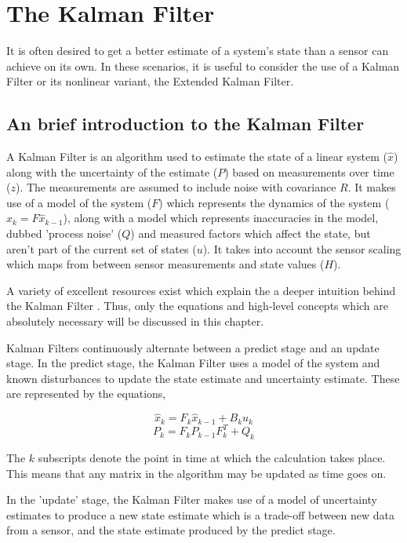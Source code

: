 \section{The Kalman Filter}
It is often desired to get a better estimate of a system's state than a sensor can achieve on its own. In these scenarios, it is useful to consider the use of a Kalman Filter or its nonlinear variant, the Extended Kalman Filter.

\subsection{An brief introduction to the Kalman Filter}
A Kalman Filter \cite{kalman1960new} is an algorithm used to estimate the state of a linear system ($\hat{x}$) along with the uncertainty of the estimate ($P$) based on measurements over time ($z$). The measurements are assumed to include noise with covariance $R$. It makes use of a model of the system ($F$) which represents the dynamics of the system ($\hat{x}_{k} = F\hat{x}_{k-1}$), along with a model which represents inaccuracies in the model, dubbed 'process noise' ($Q$) and measured factors which affect the state, but aren't part of the current set of states ($u$). It takes into account the sensor scaling which maps from between sensor measurements and state values ($H$).

A variety of excellent resources exist which explain the a deeper intuition behind the Kalman Filter \cite{website:wlu_kalman_tutorial, website:bzarg_kalman_tutorial}. Thus, only the equations and high-level concepts which are absolutely necessary will be discussed in this chapter.

Kalman Filters continuously alternate between a predict stage and an update stage. In the predict stage, the Kalman Filter uses a model of the system and known disturbances to update the state estimate and uncertainty estimate. These are represented by the equations,

\[ \hat{x}_k = F_k \hat{x}_{k-1} + B_k u_k \]
\[ P_k = F_k P_{k-1} F_k^T + Q_k \]

The $k$ subscripts denote the point in time at which the calculation takes place. This means that any matrix in the algorithm may be updated as time goes on.

In the 'update' stage, the Kalman Filter makes use of a model of uncertainty estimates to produce a new state estimate which is a trade-off between new data from a sensor, and the state estimate produced by the predict stage.

